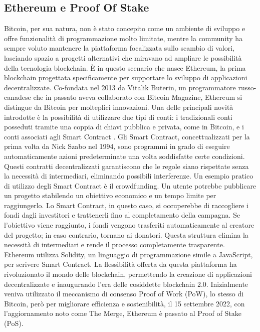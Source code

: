 \subsection{Ethereum e Proof Of Stake}
Bitcoin, per sua natura, non è stato concepito come un ambiente di sviluppo e offre funzionalità di programmazione molto limitate, mentre la community ha sempre voluto mantenere la piattaforma focalizzata sullo scambio di valori, lasciando spazio a progetti alternativi che miravano ad ampliare le possibilità della tecnologia blockchain.
È in questo scenario che nasce Ethereum, la prima blockchain progettata specificamente per supportare lo sviluppo di applicazioni decentralizzate. Co-fondata nel 2013 da Vitalik Buterin, un programmatore russo-canadese che in passato aveva collaborato con Bitcoin Magazine, Ethereum si distingue da Bitcoin per molteplici innovazioni.
Una delle principali novità introdotte è la possibilità di utilizzare due tipi di conti: i tradizionali conti posseduti tramite una coppia di chiavi pubblica e privata, come in Bitcoin, e i conti associati agli Smart Contract \cite{Blockchain_guida_allecosistema}. Gli Smart Contract, concettualizzati per la prima volta da Nick Szabo nel 1994, sono programmi in grado di eseguire automaticamente azioni predeterminate una volta soddisfatte certe condizioni.
Questi contratti decentralizzati garantiscono che le regole siano rispettate senza la necessità di intermediari, eliminando possibili interferenze.
Un esempio pratico di utilizzo degli Smart Contract è il crowdfunding. Un utente potrebbe pubblicare un progetto stabilendo un obiettivo economico e un tempo limite per raggiungerlo. Lo Smart Contract, in questo caso, si occuperebbe di raccogliere i fondi dagli investitori e trattenerli fino al completamento della campagna. Se l’obiettivo viene raggiunto, i fondi vengono trasferiti automaticamente al creatore del progetto; in caso contrario, tornano ai donatori. Questa struttura elimina la necessità di intermediari e rende il processo completamente trasparente.
Ethereum utilizza Solidity, un linguaggio di programmazione simile a JavaScript, per scrivere Smart Contract. La flessibilità offerta da questa piattaforma ha rivoluzionato il mondo delle blockchain, permettendo la creazione di applicazioni decentralizzate e inaugurando l’era delle cosiddette blockchain 2.0.
Inizialmente veniva utilizzato il meccanismo di consenso Proof of Work (PoW), lo stesso di Bitcoin, però per migliorare efficienza e sostenibilità, il 15 settembre 2022, con l’aggiornamento noto come The Merge, Ethereum è passato al Proof of Stake (PoS). 
